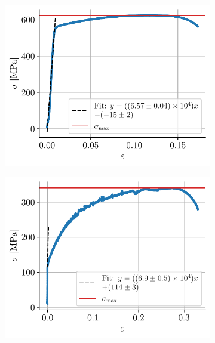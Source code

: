 \begin{figure}[h]
    \centering
    \begin{subfigure}{0.48\linewidth}
        \centering
        \includegraphics[width=\linewidth]{figures/froid1_annotated.pdf}
        \caption{}
        \label{fig:froid1}
    \end{subfigure}
    \begin{subfigure}{0.48\linewidth}
        \centering
        \includegraphics[width=\linewidth]{figures/chaud3_annotated.pdf}
        \caption{}
        \label{fig:chaud3}
    \end{subfigure}
    \begin{subfigure}{0.48\linewidth}

\end{subfigure}
\end{figure}

